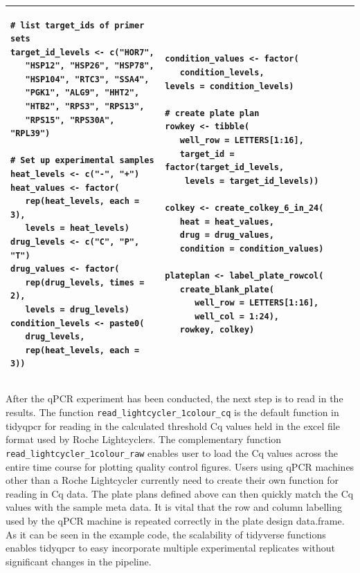 \documentclass{SBCbookchapter}
\begin{document}
\begin{center}
\begin{tabular}{ |p{5.6cm}  p{5.6cm}|}
\hline
  \begin{lstlisting}
# list target_ids of primer sets
target_id_levels <- c("HOR7",
   "HSP12", "HSP26", "HSP78",
   "HSP104", "RTC3", "SSA4",
   "PGK1", "ALG9", "HHT2",
   "HTB2", "RPS3", "RPS13",
   "RPS15", "RPS30A", "RPL39")

# Set up experimental samples
heat_levels <- c("-", "+")
heat_values <- factor(
   rep(heat_levels, each = 3),
   levels = heat_levels)
drug_levels <- c("C", "P", "T")
drug_values <- factor(
   rep(drug_levels, times = 2),
   levels = drug_levels)
condition_levels <- paste0(
   drug_levels,
   rep(heat_levels, each = 3))
\end{lstlisting}
 & 
 \begin{lstlisting}[firstnumber=20]
condition_values <- factor(
   condition_levels,
levels = condition_levels)
 
# create plate plan
rowkey <- tibble(
   well_row = LETTERS[1:16],
   target_id = factor(target_id_levels, 
    levels = target_id_levels))

colkey <- create_colkey_6_in_24(
   heat = heat_values,
   drug = drug_values,
   condition = condition_values)

plateplan <- label_plate_rowcol(
   create_blank_plate(
      well_row = LETTERS[1:16],
      well_col = 1:24),
   rowkey, colkey)
\end{lstlisting} \\ 
\hline
\end{tabular}
\end{center}
After the qPCR experiment has been conducted, the next step is to read in the results. The function \lstinline{read_lightcycler_1colour_cq} is the default function in tidyqpcr for reading in the calculated threshold Cq values held in the excel file format used by Roche Lightcyclers. The complementary function \lstinline{read_lightcycler_1colour_raw} enables user to load the Cq values across the entire time course for plotting quality control figures. Users using qPCR machines other than a Roche Lightcycler currently need to create their own function for reading in Cq data. The plate plans defined above can then quickly match the Cq values with the sample meta data. It is vital that the row and column labelling used by the qPCR machine is repeated correctly in the plate design data.frame. As it can be seen in the example code, the scalability of tidyverse functions enables tidyqpcr to easy incorporate multiple experimental replicates without significant changes in the pipeline.
\end{document}
